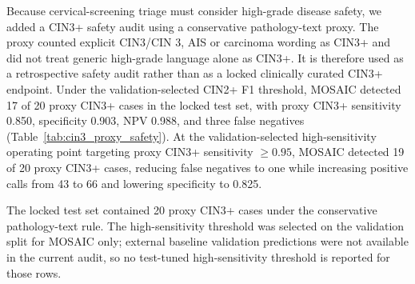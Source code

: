 Because cervical-screening triage must consider high-grade disease safety, we added a CIN3+ safety audit using a conservative pathology-text proxy. The proxy counted explicit CIN3/CIN 3, AIS or carcinoma wording as CIN3+ and did not treat generic high-grade language alone as CIN3+. It is therefore used as a retrospective safety audit rather than as a locked clinically curated CIN3+ endpoint. Under the validation-selected CIN2+ F1 threshold, MOSAIC detected 17 of 20 proxy CIN3+ cases in the locked test set, with proxy CIN3+ sensitivity 0.850, specificity 0.903, NPV 0.988, and three false negatives (Table~\ref{tab:cin3_proxy_safety}). At the validation-selected high-sensitivity operating point targeting proxy CIN3+ sensitivity \(\geq 0.95\), MOSAIC detected 19 of 20 proxy CIN3+ cases, reducing false negatives to one while increasing positive calls from 43 to 66 and lowering specificity to 0.825.

\begin{table}[!htbp]
  \centering
  \caption{CIN3+ proxy safety-oriented threshold audit on the locked test set.}
  \label{tab:cin3_proxy_safety}
  \scriptsize
  \begin{threeparttable}
  \begin{tablenotes}[flushleft]
    \footnotesize
    \item The locked test set contained 20 proxy CIN3+ cases under the conservative pathology-text rule. The high-sensitivity threshold was selected on the validation split for MOSAIC only; external baseline validation predictions were not available in the current audit, so no test-tuned high-sensitivity threshold is reported for those rows.
  \end{tablenotes}
  \end{threeparttable}
\end{table}

